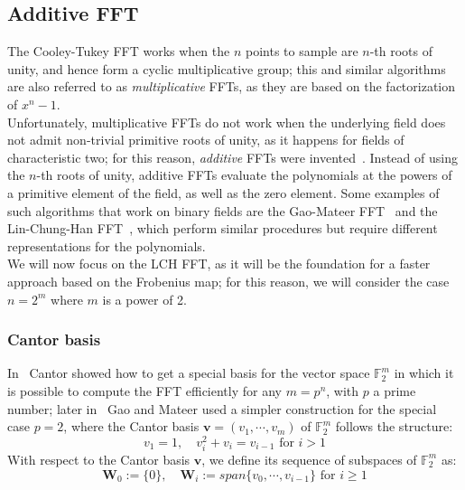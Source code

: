 \subsection{Additive FFT}
    The Cooley-Tukey FFT works when the $n$ points to sample are $n$-th roots of unity, and hence form a cyclic multiplicative group;
    this and similar algorithms are also referred to as \textit{multiplicative} FFTs, as they are based on the factorization of $x^n-1$.\\
    Unfortunately, multiplicative FFTs do not work when the underlying field does not admit non-trivial primitive roots of unity, as it happens for fields
    of characteristic two; for this reason, \textit{additive} FFTs were invented~\cite{DBLP:journals/jsac/WangZ88,DBLP:journals/jct/Cantor89}.
    Instead of using the $n$-th roots of unity, additive FFTs evaluate the polynomials at the powers of a primitive element of the field,
    as well as the zero element. Some examples of such algorithms that work on binary fields are the Gao-Mateer FFT~\cite{DBLP:journals/tit/GaoM10} 
    and the Lin-Chung-Han FFT~\cite{DBLP:conf/focs/LinCH14}, which perform similar procedures but require different representations for the polynomials.\\
    We will now focus on the LCH FFT, as it will be the foundation for a faster approach based on the Frobenius map; for this reason, we will
    consider the case $n=2^m$ where $m$ is a power of 2.
    
    \subsubsection{Cantor basis}
    In~\cite{DBLP:journals/jct/Cantor89} Cantor showed how to get a special basis for  the vector space $\mathds{F}_2^m$ in which it is possible to compute the FFT efficiently
    for any $m = p^n$, with $p$ a prime number; later in~\cite{DBLP:journals/tit/GaoM10} Gao and Mateer used a simpler construction for the special case
    $p=2$, where the Cantor basis $\mathbf{v} = (v_1, \cdots, v_{m})$ of $\mathds{F}_2^m$ follows the structure:
    \begin{equation}
        v_1 = 1, \quad v_i^2+v_i = v_{i-1} \text{ for } i > 1
    \end{equation}
    With respect to the Cantor basis $\mathbf{v}$, we define its sequence of subspaces of $\mathds{F}_2^m$ as:
    \begin{equation}
        \mathbf{W}_0 := \{0\}, \quad \mathbf{W}_i := span\{v_0, \cdots, v_{i-1}\} \text{ for } i \geqslant 1
    \end{equation}

